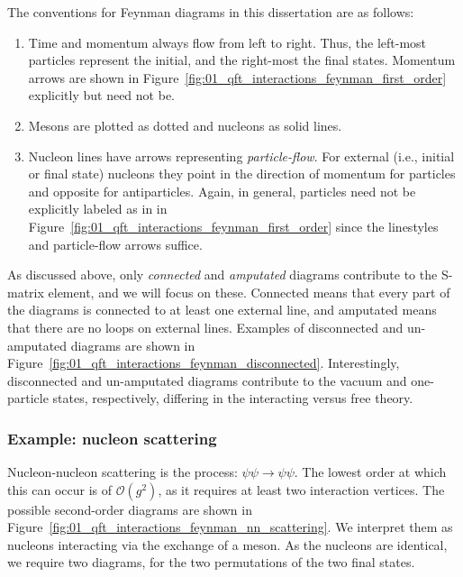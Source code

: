 The conventions for Feynman diagrams in this dissertation are as follows:
\begin{enumerate}
	\item Time and momentum always flow from left to right.
	Thus, the left-most particles represent the initial, and the right-most the final states.
	Momentum arrows are shown in Figure~\ref{fig:01_qft_interactions_feynman_first_order} explicitly but need not be.
	\item Mesons are plotted as dotted and nucleons as solid lines.
	\item Nucleon lines have arrows representing \textit{particle-flow}.
	For external (i.e., initial or final state) nucleons they point in the direction of momentum for particles and opposite for antiparticles.
	Again, in general, particles need not be explicitly labeled as in in Figure~\ref{fig:01_qft_interactions_feynman_first_order} since the linestyles and particle-flow arrows suffice.
\end{enumerate}

As discussed above, only \textit{connected} and \textit{amputated} diagrams contribute to the S-matrix element, and we will focus on these.
Connected means that every part of the diagrams is connected to at least one external line, and amputated means that there are no loops on external lines.
Examples of disconnected and un-amputated diagrams are shown in Figure~\ref{fig:01_qft_interactions_feynman_disconnected}.
Interestingly, disconnected and un-amputated diagrams contribute to the vacuum and one-particle states, respectively, differing in the interacting versus free theory.




\subsubsection{Example: nucleon scattering}

Nucleon-nucleon scattering is the process: $\psi\psi \rightarrow \psi\psi$.
The lowest order at which this can occur is of $\mathcal O(g^2)$, as it requires at least two interaction vertices.
The possible second-order diagrams are shown in Figure~\ref{fig:01_qft_interactions_feynman_nn_scattering}.
We interpret them as nucleons interacting via the exchange of a meson.
As the nucleons are identical, we require two diagrams, for the two permutations of the two final states.



